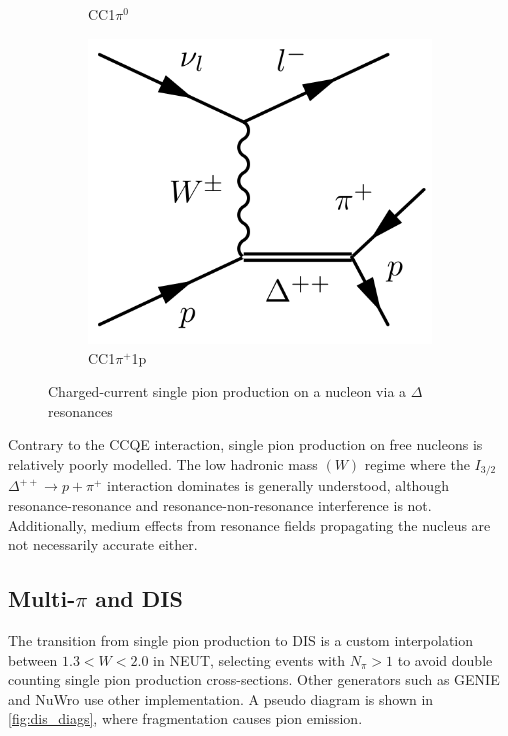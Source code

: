 \begin{figure}[h]
\begin{subfigure}[t]{0.32\textwidth}
		\caption{CC1$\pi^0$}
	\end{subfigure}
	\begin{subfigure}[t]{0.32\textwidth}
		\includegraphics[width=\textwidth, trim={0mm 0mm 0mm 0mm}, clip,page=1]{figures/niwg/diagrams/CC1ppip}
		\caption{CC1$\pi^+$1p}
	\end{subfigure}
	\caption{Charged-current single pion production on a nucleon via a $\Delta$ resonances}
	\label{fig:1pi_diags}
\end{figure}
Contrary to the CCQE interaction, single pion production on free nucleons is relatively poorly modelled. The low hadronic mass $(W)$ regime where the $I_{3/2}$ $\Delta^{++}\rightarrow p+\pi^+$ interaction dominates is generally understood, although resonance-resonance and resonance-non-resonance interference is not. Additionally, medium effects from resonance fields propagating the nucleus are not necessarily accurate either\cite{nustec,katori_martini}.

\subsection{Multi-$\pi$ and DIS}
The transition from single pion production to DIS is a custom interpolation between $1.3 < W < 2.0$ in NEUT, selecting events with $N_\pi>1$ to avoid double counting single pion production cross-sections. Other generators such as GENIE\cite{genie} and NuWro\cite{NuWro} use other implementation. A pseudo diagram is shown in \autoref{fig:dis_diags}, where fragmentation causes pion emission. 

